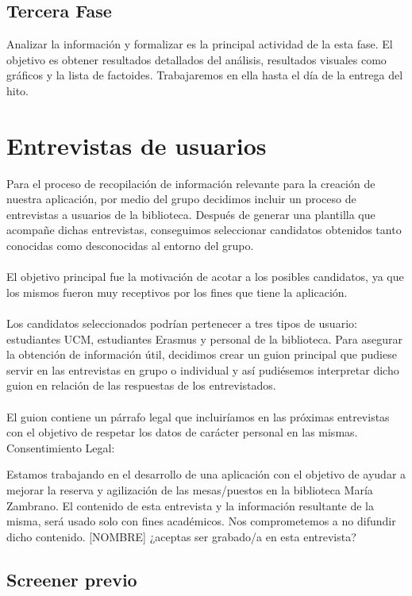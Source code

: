 \documentclass[12pt]{article}
\begin{document}
\subsection{Tercera Fase}
Analizar la información y formalizar es la principal actividad de la esta fase. El objetivo es obtener resultados detallados del análisis, resultados visuales como gráficos y la lista de factoides. Trabajaremos en ella hasta el día de la entrega del hito.

\section{Entrevistas de usuarios}
Para el proceso de recopilación de información relevante para la creación de nuestra aplicación, por medio del grupo decidimos incluir un proceso de entrevistas a usuarios de la biblioteca. Después de generar una plantilla que acompañe dichas entrevistas, conseguimos seleccionar candidatos obtenidos tanto conocidas como desconocidas al entorno del grupo.
\\
\\
El objetivo principal fue la motivación de acotar a los posibles candidatos, ya que los mismos fueron muy receptivos por los fines que tiene la aplicación. 
\\
\\
Los candidatos seleccionados podrían pertenecer a tres tipos de usuario: estudiantes UCM, estudiantes Erasmus y personal de la biblioteca. Para asegurar la obtención de información útil, decidimos crear un guion principal que pudiese servir en las entrevistas en grupo o individual y así pudiésemos interpretar dicho guion en relación de las respuestas de los entrevistados.
\\
\\
El guion contiene un párrafo legal que incluiríamos en las próximas entrevistas con el objetivo de respetar los datos de carácter personal en las mismas.
\newpage
Consentimiento Legal:
\begin{mdframed}
         Estamos trabajando en el desarrollo de una aplicación con el objetivo de ayudar a mejorar la reserva y agilización de las mesas/puestos en la biblioteca María Zambrano. 
             El contenido de esta entrevista y la información resultante de la misma, será usado solo con fines académicos.
             Nos comprometemos a no difundir dicho contenido. 
[NOMBRE] ¿aceptas ser grabado/a en esta entrevista?
\end{mdframed}

\subsection{Screener previo}
\end{document}
